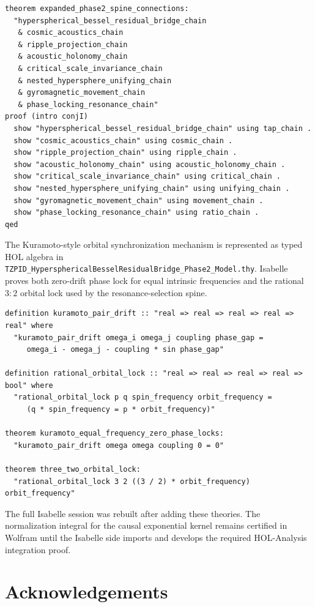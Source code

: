 \documentclass[11pt,a4paper]{article}
\begin{document}
\begin{lstlisting}
theorem expanded_phase2_spine_connections:
  "hyperspherical_bessel_residual_bridge_chain
   & cosmic_acoustics_chain
   & ripple_projection_chain
   & acoustic_holonomy_chain
   & critical_scale_invariance_chain
   & nested_hypersphere_unifying_chain
   & gyromagnetic_movement_chain
   & phase_locking_resonance_chain"
proof (intro conjI)
  show "hyperspherical_bessel_residual_bridge_chain" using tap_chain .
  show "cosmic_acoustics_chain" using cosmic_chain .
  show "ripple_projection_chain" using ripple_chain .
  show "acoustic_holonomy_chain" using acoustic_holonomy_chain .
  show "critical_scale_invariance_chain" using critical_chain .
  show "nested_hypersphere_unifying_chain" using unifying_chain .
  show "gyromagnetic_movement_chain" using movement_chain .
  show "phase_locking_resonance_chain" using ratio_chain .
qed
\end{lstlisting}

The Kuramoto-style orbital synchronization mechanism is represented as typed HOL algebra in \texttt{TZPID\_HypersphericalBesselResidualBridge\_Phase2\_Model.thy}. Isabelle proves both zero-drift phase lock for equal intrinsic frequencies and the rational $3{:}2$ orbital lock used by the resonance-selection spine.

\begin{lstlisting}
definition kuramoto_pair_drift :: "real => real => real => real => real" where
  "kuramoto_pair_drift omega_i omega_j coupling phase_gap =
     omega_i - omega_j - coupling * sin phase_gap"

definition rational_orbital_lock :: "real => real => real => real => bool" where
  "rational_orbital_lock p q spin_frequency orbit_frequency =
     (q * spin_frequency = p * orbit_frequency)"

theorem kuramoto_equal_frequency_zero_phase_locks:
  "kuramoto_pair_drift omega omega coupling 0 = 0"

theorem three_two_orbital_lock:
  "rational_orbital_lock 3 2 ((3 / 2) * orbit_frequency) orbit_frequency"
\end{lstlisting}

The full Isabelle session was rebuilt after adding these theories. The normalization integral for the causal exponential kernel remains certified in Wolfram until the Isabelle side imports and develops the required HOL-Analysis integration proof.

\section*{Acknowledgements}
\end{document}
